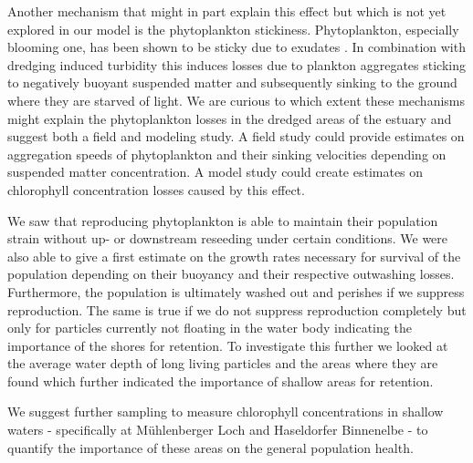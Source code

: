 \documentclass[npg, manuscript]{copernicus}
\begin{document}
Another mechanism that might in part explain this effect but which is not yet explored in our model is the phytoplankton stickiness. 
Phytoplankton, especially blooming one, has been shown to be sticky due to exudates \citep{Kiørboe1993,VanderLee2000,Dutz2005}.
In combination with dredging induced turbidity this induces losses due to plankton aggregates sticking to negatively buoyant suspended matter and subsequently sinking to the ground where they are starved of light.
We are curious to which extent these mechanisms might explain the phytoplankton losses in the dredged areas of the estuary and suggest both a field and modeling study. A field study could provide estimates on aggregation speeds of phytoplankton and their sinking velocities depending on suspended matter concentration. A model study could create estimates on chlorophyll concentration losses caused by this effect.



\conclusions  %

We saw that reproducing phytoplankton is able to maintain their population strain without up- or downstream reseeding under certain conditions.
We were also able to give a first estimate on the growth rates necessary for survival of the population depending on their buoyancy and their respective outwashing losses.
Furthermore, the population is ultimately washed out and perishes if we suppress reproduction.
The same is true if we do not suppress reproduction completely but only for particles currently not floating in the water body indicating the importance of the shores for retention.
To investigate this further we looked at the average water depth of long living particles and the areas where they are found which further indicated the importance of shallow areas for retention.

We suggest further sampling to measure chlorophyll concentrations in shallow waters - specifically at Mühlenberger Loch and Haseldorfer Binnenelbe - to quantify the importance of these areas on the general population health.
                
\end{document}
